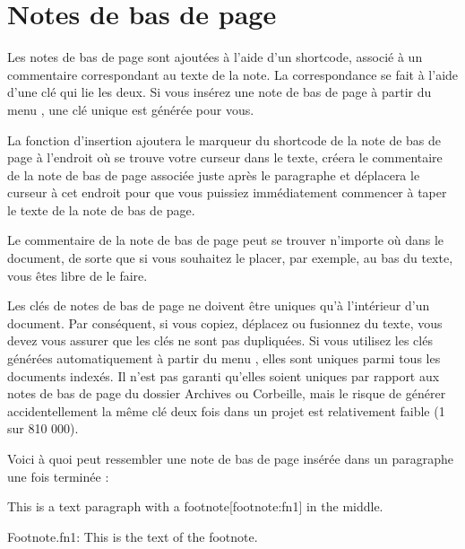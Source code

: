 \documentclass[a4paper,11pt,french]{sphinxmanual}
\begin{document}
\section{Notes de bas de page}
\label{\detokenize{usage_format:footnotes}}\label{\detokenize{usage_format:a-fmt-footnote}}
\sphinxAtStartPar
Les notes de bas de page sont ajoutées à l’aide d’un shortcode, associé à un commentaire correspondant au texte de la note. La correspondance se fait à l’aide d’une clé qui lie les deux. Si vous insérez une note de bas de page à partir du menu , une clé unique est générée pour vous.

\sphinxAtStartPar
La fonction d’insertion ajoutera le marqueur du shortcode de la note de bas de page à l’endroit où se trouve votre curseur dans le texte, créera le commentaire de la note de bas de page associée juste après le paragraphe et déplacera le curseur à cet endroit pour que vous puissiez immédiatement commencer à taper le texte de la note de bas de page.

\sphinxAtStartPar
Le commentaire de la note de bas de page peut se trouver n’importe où dans le document, de sorte que si vous souhaitez le placer, par exemple, au bas du texte, vous êtes libre de le faire.

\sphinxAtStartPar
Les clés de notes de bas de page ne doivent être uniques qu’à l’intérieur d’un document. Par conséquent, si vous copiez, déplacez ou fusionnez du texte, vous devez vous assurer que les clés ne sont pas dupliquées. Si vous utilisez les clés générées automatiquement à partir du menu , elles sont uniques parmi tous les documents indexés. Il n’est pas garanti qu’elles soient uniques par rapport aux notes de bas de page du dossier Archives ou Corbeille, mais le risque de générer accidentellement la même clé deux fois dans un projet est relativement faible (1 sur 810 000).

\sphinxAtStartPar
Voici à quoi peut ressembler une note de bas de page insérée dans un paragraphe une fois terminée :

\begin{sphinxVerbatim}[commandchars=\\\{\}]
This is a text paragraph with a footnote[footnote:fn1] in the middle.

\PYGZpc{}Footnote.fn1: This is the text of the footnote.
\end{sphinxVerbatim}

\sphinxAtStartPar
{}
\end{document}
